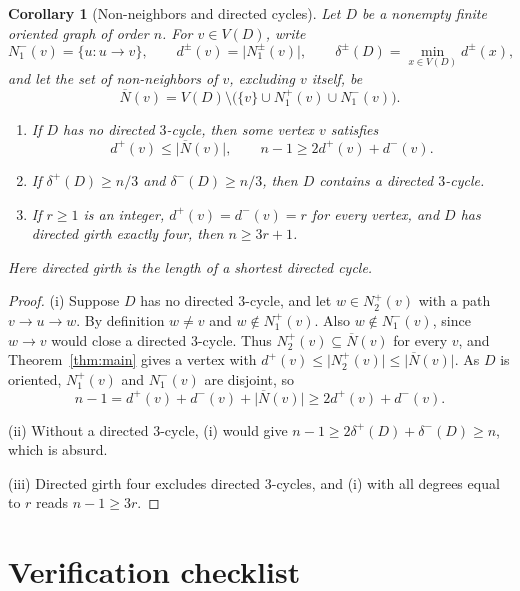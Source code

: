 \documentclass[11pt]{article}
\newtheorem{corollary}[theorem]{Corollary}
\theoremstyle{remark}
\newcommand{\abs}[1]{\lvert #1\rvert}
\begin{document}
\begin{corollary}[Non-neighbors and directed cycles]\label{cor:directed-cycle-consequences}
Let \(D\) be a nonempty finite oriented graph of order \(n\).  For
\(v\in V(D)\), write
\[
 N_1^-(v)=\{u:u\to v\},\qquad
 d^\pm(v)=\abs{N_1^\pm(v)},\qquad
 \delta^\pm(D)=\min_{x\in V(D)}d^\pm(x),
\]
and let the set of non-neighbors of \(v\), excluding \(v\) itself, be
\[
 \overline N(v)=V(D)\setminus
 \bigl(\{v\}\cup N_1^+(v)\cup N_1^-(v)\bigr).
\]
\begin{enumerate}[label=\textup{(\roman*)}]
\item If \(D\) has no directed \(3\)-cycle, then some vertex \(v\) satisfies
\[
 d^+(v)\leq\abs{\overline N(v)},\qquad
 n-1\geq 2d^+(v)+d^-(v).
\]
\item If \(\delta^+(D)\geq n/3\) and \(\delta^-(D)\geq n/3\), then \(D\)
contains a directed \(3\)-cycle.
\item If \(r\geq1\) is an integer, \(d^+(v)=d^-(v)=r\) for every vertex,
and \(D\) has directed girth exactly four, then \(n\geq3r+1\).
\end{enumerate}
Here directed girth is the length of a shortest directed cycle.
\end{corollary}

\begin{proof}
\textup{(i)} Suppose \(D\) has no directed \(3\)-cycle, and let
\(w\in N_2^+(v)\) with a path \(v\to u\to w\).  By definition \(w\ne v\) and
\(w\notin N_1^+(v)\).  Also \(w\notin N_1^-(v)\), since \(w\to v\) would
close a directed \(3\)-cycle.  Thus \(N_2^+(v)\subseteq\overline N(v)\) for
every \(v\), and Theorem~\ref{thm:main} gives a vertex with
\(d^+(v)\leq\abs{N_2^+(v)}\leq\abs{\overline N(v)}\).  As \(D\) is oriented,
\(N_1^+(v)\) and \(N_1^-(v)\) are disjoint, so
\[
 n-1=d^+(v)+d^-(v)+\abs{\overline N(v)}
 \geq 2d^+(v)+d^-(v).
\]

\textup{(ii)} Without a directed \(3\)-cycle, \textup{(i)} would give
\(n-1\geq2\delta^+(D)+\delta^-(D)\geq n\), which is absurd.

\textup{(iii)} Directed girth four excludes directed \(3\)-cycles, and
\textup{(i)} with all degrees equal to \(r\) reads \(n-1\geq3r\).
\end{proof}

\section{Verification checklist}\label{sec:checklist}
\end{document}

